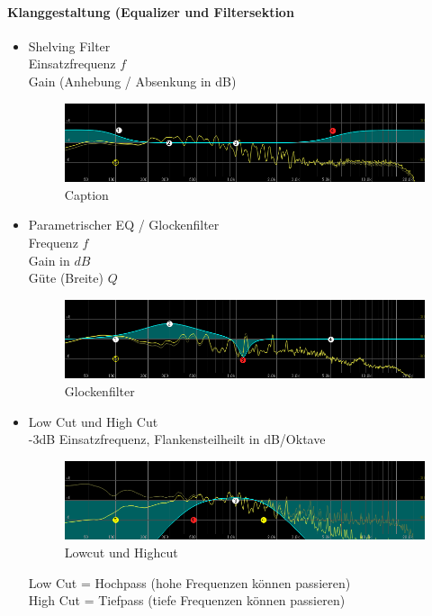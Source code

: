 \newpage
\paragraph{Klanggestaltung (Equalizer und Filtersektion}
\begin{itemize}
    \item Shelving Filter\\
        Einsatzfrequenz $f$\\
        Gain (Anhebung / Absenkung in dB)
        \begin{figure}[h]
            \centering
            \includegraphics[width=0.5\linewidth]{Bilder/Medientechnik/Shelf.png}
            \caption{Caption}
            \label{fig:enter-label}
        \end{figure}

    \item Parametrischer EQ / Glockenfilter\\
        Frequenz $f$\\
        Gain in $dB$\\
        Güte (Breite) $Q$\\
        \begin{figure}[h]
            \centering
            \includegraphics[width=0.5\linewidth]{Bilder/Medientechnik/Glockenfilter.png}
            \caption{Glockenfilter}
            \label{fig:enter-label}
        \end{figure}
    
    \item Low Cut und High Cut\\
        -3dB Einsatzfrequenz, Flankensteilheilt in dB/Oktave\\
\begin{figure}[h]
    \centering
    \includegraphics[width=0.5\linewidth]{Bilder/Medientechnik/LowHighpass.png}
    \caption{Lowcut und Highcut}
    \label{fig:Lowcut, Highcut}
\end{figure}
        Low Cut = Hochpass (hohe Frequenzen können passieren)\\
        High Cut = Tiefpass (tiefe Frequenzen können passieren)\\
\end{itemize}

